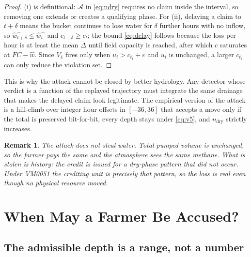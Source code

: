 \documentclass[journal]{IEEEtran}
\newtheorem{remark}{Remark}
\begin{document}
\begin{proof}
(i) is definitional: $\mathcal{A}$ in \eqref{eq:ndry} requires no claim inside
the interval, so removing one extends or creates a qualifying phase. For (ii),
delaying a claim to $t+\delta$ means the bucket continues to lose water for
$\delta$ further hours with no inflow, so $\hat w_{t+\delta}^{-}\le\hat w_t^{-}$
and $c_{t+\delta}\ge c_t$; the bound \eqref{eq:delay} follows because the loss
per hour is at least the mean $\overline{\Delta}$ until field capacity is
reached, after which $c$ saturates at $FC-\hat w$. Since $V_4$ fires only when
$u_i>c_{t_i}+\varepsilon$ and $u_i$ is unchanged, a larger $c_{t_i}$ can only
reduce the violation set.
\end{proof}

This is why the attack cannot be closed by better hydrology. Any detector whose
verdict is a function of the replayed trajectory must integrate the same
drainage that makes the delayed claim look legitimate. The empirical version of
the attack is a hill-climb over integer hour offsets in $[-36,36]$ that accepts a
move only if the total is preserved bit-for-bit, every depth stays under
\eqref{eq:v5}, and $n_{\mathrm{dry}}$ strictly increases.

\begin{remark}
The attack does not steal water. Total pumped volume is unchanged, so the farmer
pays the same and the atmosphere sees the same methane. What is stolen is
\emph{history}: the credit is issued for a dry-phase pattern that did not occur.
Under VM0051 the crediting unit is precisely that pattern, so the loss is real
even though no physical resource moved.
\end{remark}

\section{When May a Farmer Be Accused?}
\label{sec:guarantee}

\subsection{The admissible depth is a range, not a number}
\label{sec:umax}
\end{document}
